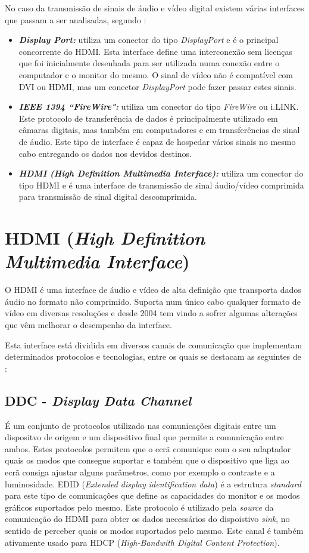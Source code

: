 No caso da transmissão de sinais de áudio e vídeo digital existem várias interfaces que passam a ser analisadas, segundo \cite{R004}:
\begin{itemize}
	\item \textbf{\textit{Display Port:}} utiliza um conector do tipo \textit{DisplayPort} e é o principal concorrente do HDMI. Esta interface define uma interconexão sem licenças que foi inicialmente desenhada para ser utilizada numa conexão entre o computador e o monitor do mesmo. O sinal de vídeo não é compatível com DVI ou HDMI, mas um conector \textit{DisplayPort} pode fazer passar estes sinais.
	\item \textbf{\textit{ IEEE 1394 “FireWire":}} utiliza um conector do tipo \textit{FireWire} ou i.LINK. Este protocolo de transferência de dados é principalmente utilizado em câmaras digitais, mas também em computadores e em transferências de sinal de áudio. Este tipo de interface é capaz de hospedar vários sinais no mesmo cabo entregando os dados nos devidos destinos.
	\item \textbf{\textit{HDMI (High Definition Multimedia Interface):}} utiliza um conector do tipo HDMI e é uma interface de transmissão de sinal áudio/vídeo comprimida para transmissão de sinal digital descomprimida. 
\end{itemize}

\section{HDMI (\textit{High Definition Multimedia Interface})}\label{sec:HDMI}
O HDMI é uma interface de áudio e vídeo de alta definição que transporta dados áudio no formato não comprimido. Suporta num único cabo qualquer formato de vídeo em diversas resoluções e desde 2004 tem vindo a sofrer algumas alterações que vêm melhorar o desempenho da interface. 

Esta interface está dividida em diversos canais de comunicação que implementam determinados protocolos e tecnologias, entre os quais se destacam as seguintes de \cite{R002}:
\subsection*{DDC - \textit{Display Data Channel} } \label{subsec:DDC} 
É um conjunto de protocolos utilizado nas comunicações digitais entre um dispositvo de origem e um dispositivo final que permite a comunicação entre ambos. Estes protocolos permitem que o ecrã comunique com o seu adaptador quais os modos que consegue suportar e também que o dispositivo que liga ao ecrã consiga ajustar alguns parâmetros, como por exemplo o contraste e a luminosidade. EDID (\textit{Extended display identification data}) é a estrutura \textit{standard} para este tipo de comunicações que define as capacidades do monitor e os modos gráficos suportados pelo mesmo.  Este protocolo é utilizado pela \textit{source} da comunicação do HDMI para obter os dados necessários do dispoistivo \textit{sink}, no sentido de perceber quais os modos suportados pelo mesmo. Este canal é também ativamente usado para HDCP (\textit{High-Bandwith Digital Content Protection}).

